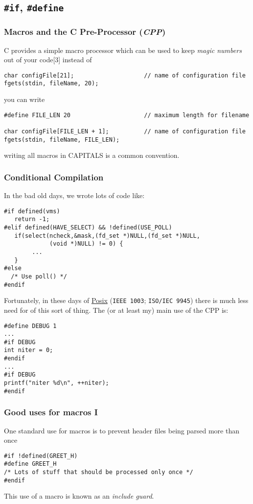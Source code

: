\documentclass[10pt, t]{beamer}
\begin{document}
\subsection{\texttt{\#if}, \texttt{\#define}}
\label{sec-4_1}
\begin{frame}[fragile]
\frametitle{Macros and the C Pre-Processor (\emph{CPP})}
\label{sec-4_1_1}

C provides a simple macro processor which can be used to keep \emph{magic numbers} out of your
code[3]
instead of
\begin{verbatim}
char configFile[21];                    // name of configuration file
fgets(stdin, fileName, 20);
\end{verbatim}
\pause
you can write
\begin{verbatim}
#define FILE_LEN 20                     // maximum length for filename

char configFile[FILE_LEN + 1];          // name of configuration file
fgets(stdin, fileName, FILE_LEN);
\end{verbatim}
\pause writing all macros in CAPITALS is a common convention.
\end{frame}
\begin{frame}[fragile]
\frametitle{Conditional Compilation}
\label{sec-4_1_2}

In the bad old days, we wrote lots of code like:
\begin{verbatim}
#if defined(vms)
   return -1;
#elif defined(HAVE_SELECT) && !defined(USE_POLL)
   if(select(ncheck,&mask,(fd_set *)NULL,(fd_set *)NULL,
             (void *)NULL) != 0) {
        ...
   }
#else
  /* Use poll() */
#endif
\end{verbatim}
\pause
Fortunately, in these days of \href{http://www.opengroup.org/onlinepubs/009695399/}{Posix} (\texttt{IEEE 1003}; \texttt{ISO/IEC 9945}) there is much less need for of this sort of thing.
\pause 
The (or at least my) main use of the CPP is:
\begin{verbatim}
#define DEBUG 1
...
#if DEBUG
int niter = 0;
#endif
...
#if DEBUG
printf("niter %d\n", ++niter);
#endif
\end{verbatim}
\end{frame}
\begin{frame}[fragile]
\frametitle{Good uses for macros I}
\label{sec-4_1_3}

One standard use for macros is to prevent header files being parsed more than once
\begin{verbatim}
#if !defined(GREET_H)
#define GREET_H
/* Lots of stuff that should be processed only once */
#endif
\end{verbatim}

This use of a macro is known as an \emph{include guard}.
\end{frame}
\end{document}
